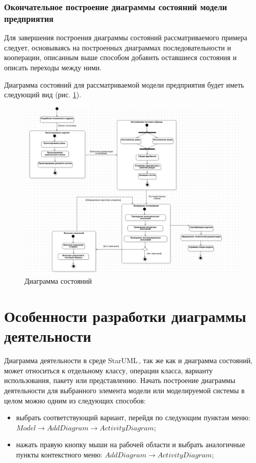 \documentclass[a4paper,12pt]{extreport}
\newcommand{\staruml}{StarUML\,\tm}
\begin{document}
\subsubsection*{Окончательное построение диаграммы состояний модели предприятия}
Для завершения построения диаграммы состояний рассматриваемого примера следует, основываясь на построенных диаграммах последовательности и кооперации, описанным выше способом добавить оставшиеся состояния и описать переходы между ними.

Диаграмма состояний для рассматриваемой модели предприятия будет иметь следующий вид (рис. \ref{fig:statechart}).
\begin{figure}[h!]
	\centering
	\includegraphics[width=1\linewidth]{images/statechart}
	\caption{Диаграмма состояний}
	\label{fig:statechart}
\end{figure}

\section{Особенности разработки диаграммы деятельности}
Диаграмма деятельности в среде \staruml, так же как и диаграмма состояний, может относиться к отдельному классу, операции класса, варианту использования, пакету или представлению. Начать построение диаграммы деятельности для выбранного элемента модели или моделируемой системы в целом можно одним из следующих способов:
\begin{itemize}
	\item выбрать соответствующий вариант, перейдя по следующим пунктам меню: \\$Model \to Add Diagram \to Activity Diagram$;
	\item нажать правую кнопку мыши на рабочей области и выбрать аналогичные пункты контекстного меню: $Add Diagram \to Activity Diagram$;
\end{itemize}
\end{document}
